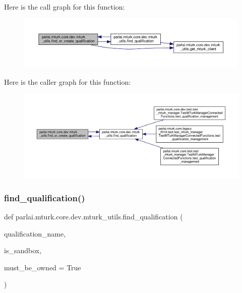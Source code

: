 Here is the call graph for this function\+:
\nopagebreak
\begin{figure}[H]
\begin{center}
\leavevmode
\includegraphics[width=350pt]{namespaceparlai_1_1mturk_1_1core_1_1dev_1_1mturk__utils_ab4c0dfc58f9fe37c28c9d23628d1de4e_cgraph}
\end{center}
\end{figure}
Here is the caller graph for this function\+:
\nopagebreak
\begin{figure}[H]
\begin{center}
\leavevmode
\includegraphics[width=350pt]{namespaceparlai_1_1mturk_1_1core_1_1dev_1_1mturk__utils_ab4c0dfc58f9fe37c28c9d23628d1de4e_icgraph}
\end{center}
\end{figure}
\mbox{\label{namespaceparlai_1_1mturk_1_1core_1_1dev_1_1mturk__utils_acd636315cbbf11cc5d9d641173e51586}} 
\subsubsection{\texorpdfstring{find\+\_\+qualification()}{find\_qualification()}}
{\footnotesize\ttfamily def parlai.\+mturk.\+core.\+dev.\+mturk\+\_\+utils.\+find\+\_\+qualification (\begin{DoxyParamCaption}\item[{}]{qualification\+\_\+name,  }\item[{}]{is\+\_\+sandbox,  }\item[{}]{must\+\_\+be\+\_\+owned = {\ttfamily True} }\end{DoxyParamCaption})}

